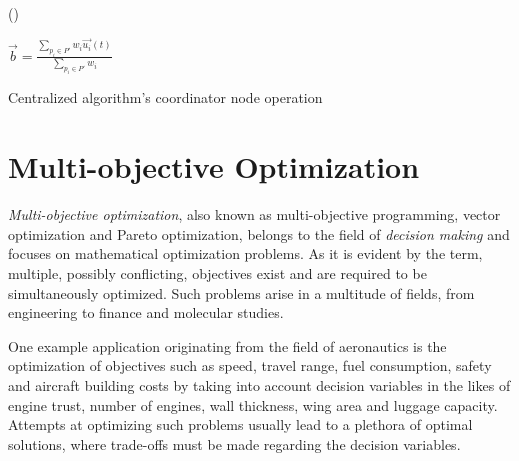 \begin{algorithm}



\Fn(){}{
	$\vec{b}=\frac{ \sum_{p_i \in P'} {w_i\vec{u_i}(t)} }{ \sum_{p_i \in P'} {w_i} }$\;

}
\caption{Centralized algorithm's coordinator node operation\label{algo:centralizedCoordinatorNode}} 
\end{algorithm}


\section{Multi-objective Optimization} \label{sec:theorBack-MOP}

\emph{Multi-objective optimization}, also known as multi-objective programming, vector optimization and Pareto optimization, belongs to the field of \emph{decision making} and focuses on mathematical optimization problems. As it is evident by the term, multiple, possibly conflicting, objectives exist and are required to be simultaneously optimized. Such problems arise in a multitude of fields, from engineering to finance and molecular studies. 

One example application originating from the field of aeronautics is the optimization of objectives such as speed, travel range, fuel consumption, safety and aircraft building costs by taking into account decision variables in the likes of engine trust, number of engines, wall thickness, wing area and luggage capacity. Attempts at optimizing such problems usually lead to a plethora of optimal solutions, where trade-offs must be made regarding the decision variables.

